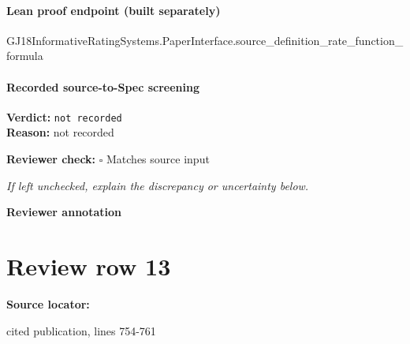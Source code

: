 \documentclass[10pt]{article}
\newcommand{\reviewerbox}{%
  \par\noindent\fbox{\parbox{0.96\linewidth}{\rule{0pt}{0.38in}}}\par
}
\newcommand{\reviewmatch}[1]{%
  \par\noindent\textbf{Reviewer check:} $\square$\; #1\par
  \noindent\emph{If left unchecked, explain the discrepancy or uncertainty below.}\par
}
\begin{document}
\paragraph{Lean proof endpoint (built separately)}\begin{ReviewVerbatim}
GJ18InformativeRatingSystems.PaperInterface.source_definition_rate_function_formula
\end{ReviewVerbatim}

\paragraph{Recorded source-to-Spec screening}
\textbf{Verdict:} \texttt{not recorded}
\\
\textbf{Reason:} not recorded
\reviewmatch{Matches source input}
\noindent\textbf{Reviewer annotation}\par
\reviewerbox
\clearpage
\hypertarget{source-claim-3ef1c348966685a2}{}
\section*{Review row 13}
\textbf{Source locator:} {\footnotesize\raggedright cited publication, lines 754-\allowbreak{}761\par}
\end{document}
